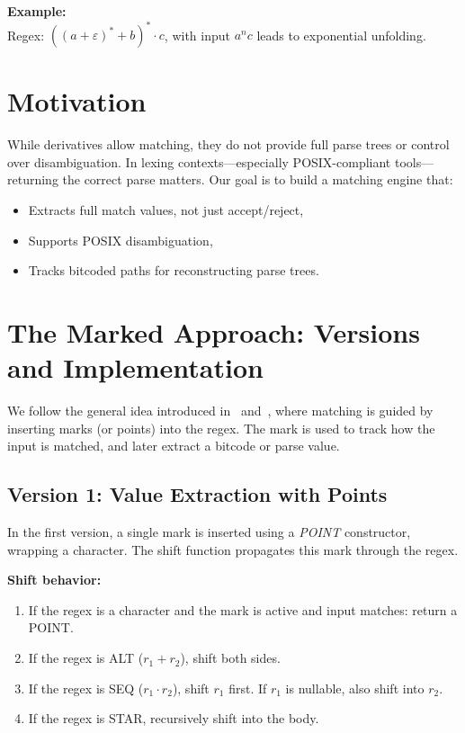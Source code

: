\documentclass[11pt]{article}
\begin{document}
\textbf{Example:}\\
Regex: $((a + \varepsilon)^* + b)^* \cdot c$, with input $a^n c$ leads to exponential unfolding.

\section{Motivation}

While derivatives allow matching, they do not provide full parse trees or control over disambiguation. In lexing contexts—especially POSIX-compliant tools—returning the correct parse matters. Our goal is to build a matching engine that:
\begin{itemize}
    \item Extracts full match values, not just accept/reject,
    \item Supports POSIX disambiguation,
    \item Tracks bitcoded paths for reconstructing parse trees.
\end{itemize}

\section{The Marked Approach: Versions and Implementation}

We follow the general idea introduced in~\cite{Fischer2010} and~\cite{Asperti2010}, where matching is guided by inserting marks (or points) into the regex. The mark is used to track how the input is matched, and later extract a bitcode or parse value.

\subsection*{Version 1: Value Extraction with Points}

In the first version, a single mark is inserted using a \emph{POINT} constructor, wrapping a character. The shift function propagates this mark through the regex.

\textbf{Shift behavior:}
\begin{enumerate}
    \item If the regex is a character and the mark is active and input matches: return a POINT.
    \item If the regex is ALT ($r_1 + r_2$), shift both sides.
    \item If the regex is SEQ ($r_1 \cdot r_2$), shift $r_1$ first. If $r_1$ is nullable, also shift into $r_2$.
    \item If the regex is STAR, recursively shift into the body.
\end{enumerate}
\end{document}
